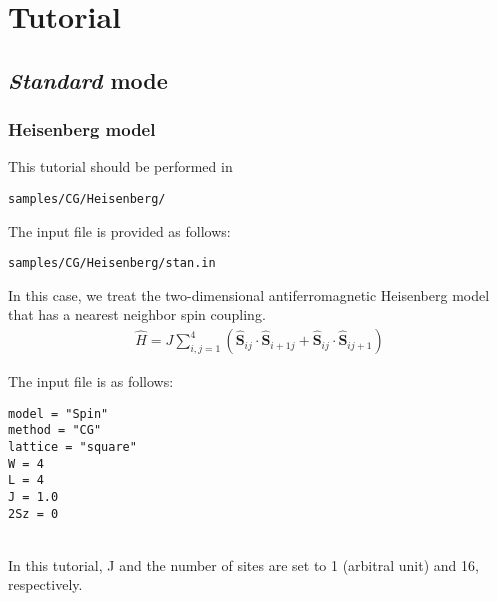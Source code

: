 \chapter{Tutorial}
\label{Ch:model}
\section{{\it Standard} mode}

\subsection{Heisenberg model}

This tutorial should be performed in 
\begin{verbatim}
samples/CG/Heisenberg/
\end{verbatim}

The input file is provided as follows:
\begin{verbatim}
samples/CG/Heisenberg/stan.in
\end{verbatim}
%
In this case, we treat the two-dimensional antiferromagnetic Heisenberg model
that has a nearest neighbor spin coupling.
\begin{align}
  {\hat H} = J \sum_{i,j=1}^{4}(
  {\hat {\boldsymbol S}}_{i j} \cdot {\hat {\boldsymbol S}}_{i+1 j} +
  {\hat {\boldsymbol S}}_{i j} \cdot {\hat {\boldsymbol S}}_{i j+1}
  )
\end{align}

The input file is as follows:
\\
\begin{minipage}{10cm}
\begin{screen}
\begin{verbatim}
model = "Spin"
method = "CG"
lattice = "square"
W = 4
L = 4
J = 1.0
2Sz = 0
\end{verbatim}
\end{screen}
\end{minipage}
%
\\
In this tutorial, J and the number of sites are set to 1 (arbitral unit)
and 16, respectively.

